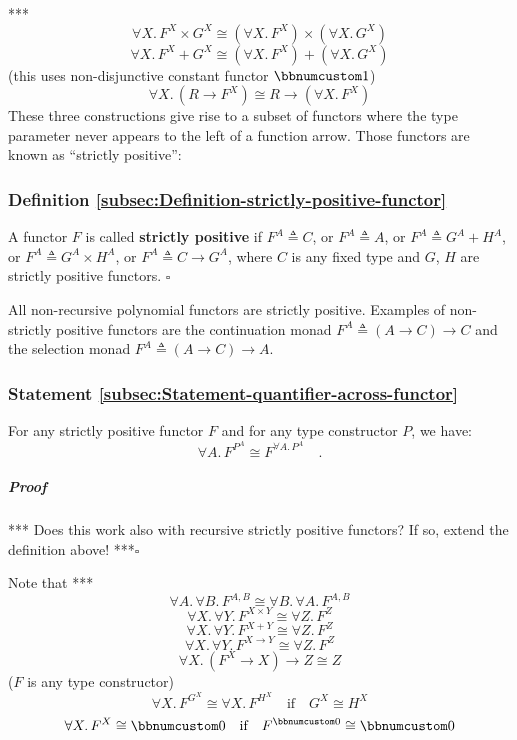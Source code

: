 {*}{*}{*}
\[
\forall X.\,F^{X}\times G^{X}\cong(\forall X.\,F^{X})\times(\forall X.\,G^{X})
\]
\[
\forall X.\,F^{X}+G^{X}\cong(\forall X.\,F^{X})+(\forall X.\,G^{X})
\]
(this uses non-disjunctive constant functor $\bbnum 1$)
\[
\forall X.\,(R\rightarrow F^{X})\cong R\rightarrow(\forall X.\,F^{X})
\]
These three constructions give rise to a subset of functors where
the type parameter never appears to the left of a function arrow.
Those functors are known as \textsf{``}strictly positive\textsf{''}:

\subsubsection{Definition \label{subsec:Definition-strictly-positive-functor}\ref{subsec:Definition-strictly-positive-functor}}

A functor $F$ is called \textbf{strictly
positive} if $F^{A}\triangleq C$, or $F^{A}\triangleq A$, or $F^{A}\triangleq G^{A}+H^{A}$,
or $F^{A}\triangleq G^{A}\times H^{A}$, or $F^{A}\triangleq C\rightarrow G^{A}$,
where $C$ is any fixed type and $G$, $H$ are strictly positive
functors. $\square$

All non-recursive polynomial functors are strictly positive. Examples
of non-strictly positive functors are the continuation monad $F^{A}\triangleq(A\rightarrow C)\rightarrow C$
and the selection monad $F^{A}\triangleq(A\rightarrow C)\rightarrow A$.

\subsubsection{Statement \label{subsec:Statement-quantifier-across-functor}\ref{subsec:Statement-quantifier-across-functor}}

For any strictly positive functor $F$ and for any type constructor
$P$, we have:
\[
\forall A.\,F^{P^{A}}\cong F^{\forall A.\,P^{A}}\quad.
\]


\subparagraph{Proof}

{*}{*}{*} Does this work also with recursive strictly positive functors?
If so, extend the definition above! {*}{*}{*}$\square$

Note that {*}{*}{*}
\[
\forall A.\,\forall B.\,F^{A,B}\cong\forall B.\,\forall A.\,F^{A,B}
\]
\[
\forall X.\,\forall Y.\,F^{X\times Y}\cong\forall Z.\,F^{Z}
\]
\[
\forall X.\,\forall Y.\,F^{X+Y}\cong\forall Z.\,F^{Z}
\]
\[
\forall X.\,\forall Y.\,F^{X\rightarrow Y}\cong\forall Z.\,F^{Z}
\]
\[
\forall X.\,(F^{X}\rightarrow X)\rightarrow Z\cong Z
\]
($F$ is any type constructor)
\[
\forall X.\,F^{G^{X}}\cong\forall X.\,F^{H^{X}}\quad\text{if}\quad G^{X}\cong H^{X}
\]
\[
\forall X.\,F^{X}\cong\bbnum 0\quad\text{if}\quad F^{\bbnum 0}\cong\bbnum 0
\]

